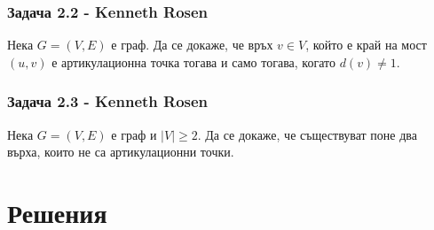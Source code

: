 \documentclass[12pt]{article}
\begin{document}
\subsubsection*{Задача 2.2 - Kenneth Rosen}
Нека $G = (V, E)$ е граф. Да се докаже, че връх $v \in V$, който е край на мост $(u, v)$ е артикулационна точка тогава и само тогава, когато $d(v) \neq 1$. 
\subsubsection*{Задача 2.3 - Kenneth Rosen}
Нека $G = (V, E)$ е граф и $|V| \geq 2$. Да се докаже, че съществуват поне два върха, които не са артикулационни точки. 


\section*{Решения}
\end{document}
